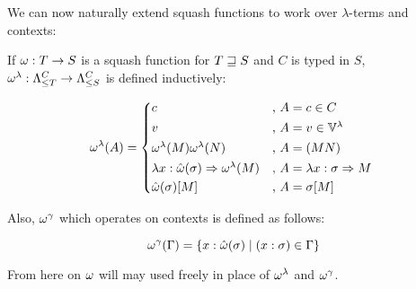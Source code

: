 \documentclass[main.tex]{subfiles}
\begin{document}
We can now naturally extend squash functions to work over $\lambda$-terms
and contexts:
\begin{defn}
    If $\squash: T \rightarrow S$ is a squash function for $T \tless S$ and
    $C$ is typed in $S$,
    $\lsquash: \fancylambda{T}{C} \rightarrow \fancylambda{S}{C}$
    is defined inductively:

    \[
        \lsquash(A) =
        \begin{cases*}
            c &, $A = c \in C$ \\
            v &, $A = v \in \lvars$ \\
            \lsquash(M) \lsquash(N) &, $A = (MN)$ \\
            \lambda x : \tsquash(\sigma) \abstr \lsquash(M)
                &, $A = \lambda x : \sigma \abstr M$ \\
                \tsquash(\sigma)[M] &, $A = \sigma[M]$ \\
        \end{cases*}
    \]

    Also,
    $\consquash$ which operates on contexts
    is defined as follows:

    \[
        \consquash(\Gamma)
            = \{ x : \tsquash(\sigma) \mid (x : \sigma) \in \Gamma \}
    \]
\end{defn}

From here on $\squash$ will may used freely in place of $\lsquash$
and $\consquash$.
\end{document}
